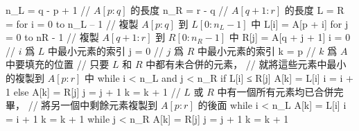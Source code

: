 \startCLRSCODE
n_{L} = q - p + 1	// $A[p : q]$ 的長度
n_{R} = r - q		// $A[q + 1 : r]$ 的長度
L = 
R = 
for i = 0 to n_L – 1	// 複製 $A[p : q]$ 到 $L[0 : n_L - 1]$ 中
	L[i] = A[p + i]
for j = 0 to nR - 1	// 複製 $A[q + 1 : r]$ 到 $R[0 : n_R - 1]$ 中
	R[j] = A[q + j + 1]
i = 0	// $i$ 爲 $L$ 中最小元素的索引
j = 0	// $j$ 爲 $R$ 中最小元素的索引
k = p	// $k$ 爲 $A$ 中要填充的位置
// 只要 $L$ 和 $R$ 中都有未合併的元素，
// 就將這些元素中最小的複製到 $A[p : r]$ 中
while i < n_L and j < n_R
	if L[i] ≤ R[j]
		A[k] = L[i]
		i = i + 1
	else
		A[k] = R[j]
		j = j + 1
	k = k + 1
// $L$ 或 $R$ 中有一個所有元素均已合併完畢，
// 將另一個中剩餘元素複製到 $A[p : r]$ 的後面
while i < n_L
	A[k] = L[i]
	i = i + 1
	k = k + 1
while j < n_R
	A[k] = R[j]
	j = j + 1
	k = k + 1
\stopCLRSCODE
